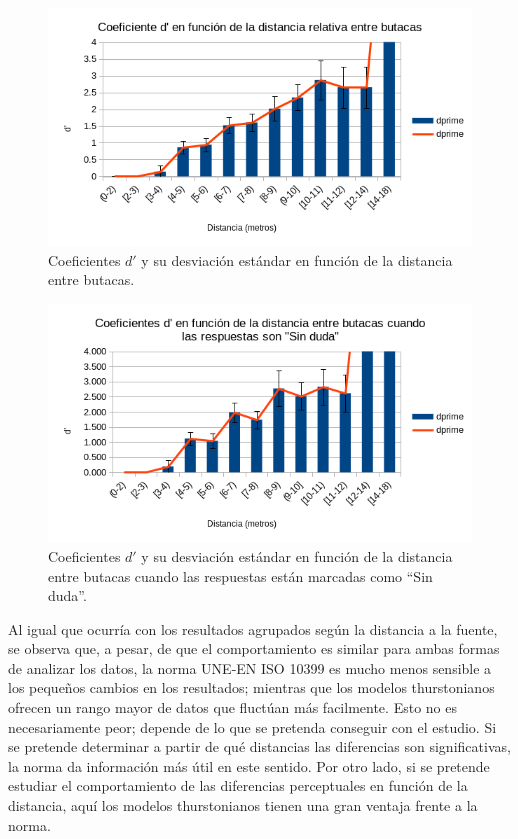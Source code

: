 \documentclass[11pt,a4paper]{book}
\begin{document}
		    \begin{figure}
                \includegraphics[scale=0.7]{../imagenes/analisisThurstButacasDuda.png}
			    \centering
			    \caption{Coeficientes $d'$ y su desviación estándar en función de la distancia entre butacas.} 
			    \label{fig:ThurstButacasDuda}
            \end{figure}
            
            \begin{figure}
                \includegraphics[scale=0.7]{../imagenes/analisisThurstButacasSinDuda.png}
			    \centering
			    \caption{Coeficientes $d'$ y su desviación estándar en función de la distancia entre butacas cuando las respuestas están marcadas como ``Sin duda''.} 
			    \label{fig:ThurstButacasSinDuda}
            \end{figure}
            
            Al igual que ocurría con los resultados agrupados según la distancia a la fuente, se observa que, a pesar, de que el comportamiento es similar para ambas formas de analizar los datos, la norma UNE-EN ISO 10399\cite{ISO10399} es mucho menos sensible a los pequeños cambios en los resultados; mientras que los modelos thurstonianos ofrecen un rango mayor de datos que fluctúan más facilmente. Esto no es necesariamente peor; depende de lo que se pretenda conseguir con el estudio. Si se pretende determinar a partir de qué distancias las diferencias son significativas, la norma da información más útil en este sentido. Por otro lado, si se pretende estudiar el comportamiento de las diferencias perceptuales en función de la distancia, aquí los modelos thurstonianos tienen una gran ventaja frente a la norma.
            
\end{document}
